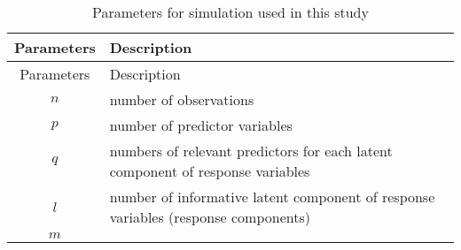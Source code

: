 \documentclass[12pt,A4paper,authoryear]{elsarticle} %
\begin{document}
\begin{longtable}[]{@{}cl@{}}
\caption{\label{tab:parameters} Parameters for simulation used in this
study}\tabularnewline
\toprule
\begin{minipage}[b]{0.19\columnwidth}\centering\strut
Parameters\strut
\end{minipage} & \begin{minipage}[b]{0.75\columnwidth}\raggedright\strut
Description\strut
\end{minipage}\tabularnewline
\midrule
\endfirsthead
\toprule
\begin{minipage}[b]{0.19\columnwidth}\centering\strut
Parameters\strut
\end{minipage} & \begin{minipage}[b]{0.75\columnwidth}\raggedright\strut
Description\strut
\end{minipage}\tabularnewline
\midrule
\endhead
\begin{minipage}[t]{0.19\columnwidth}\centering\strut
\(n\)\strut
\end{minipage} & \begin{minipage}[t]{0.75\columnwidth}\raggedright\strut
number of observations\strut
\end{minipage}\tabularnewline
\begin{minipage}[t]{0.19\columnwidth}\centering\strut
\(p\)\strut
\end{minipage} & \begin{minipage}[t]{0.75\columnwidth}\raggedright\strut
number of predictor variables\strut
\end{minipage}\tabularnewline
\begin{minipage}[t]{0.19\columnwidth}\centering\strut
\(q\)\strut
\end{minipage} & \begin{minipage}[t]{0.75\columnwidth}\raggedright\strut
numbers of relevant predictors for each latent component of response
variables\strut
\end{minipage}\tabularnewline
\begin{minipage}[t]{0.19\columnwidth}\centering\strut
\(l\)\strut
\end{minipage} & \begin{minipage}[t]{0.75\columnwidth}\raggedright\strut
number of informative latent component of response variables (response
components)\strut
\end{minipage}\tabularnewline
\begin{minipage}[t]{0.19\columnwidth}\centering\strut
\(m\)\strut
\end{minipage} & \begin{minipage}[t]{0.75\columnwidth}\raggedright\strut

\end{minipage}
\end{longtable}
\end{document}
